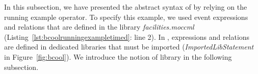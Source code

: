 In this subsection, we have presented the abstract syntax of \bcool by relying on the running example operator. To specify this example, we used event expressions and relations that are defined in the library \emph{facilities.moccml} (Listing~\ref{lst:bcoolrunningexampletimed}: line 2). In \bcool, expressions and relations are defined in dedicated libraries that must be imported (\emph{ImportedLibStatement} in Figure~\ref{fig:bcool}). We introduce the notion of library in the following subsection.
	
	
	
	



